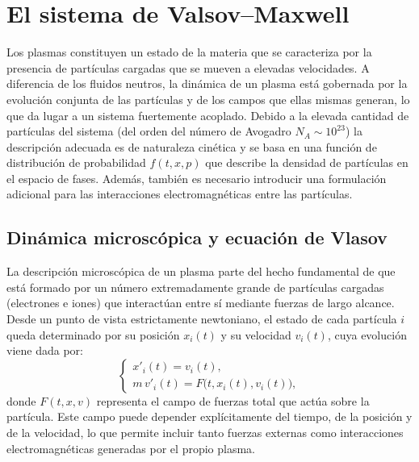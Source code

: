 \documentclass[11pt,a4paper,twoside,pdf]{article}
\numberwithin{equation}{section}
\begin{document}
\newpage

\section{El sistema de Valsov--Maxwell}

Los plasmas constituyen un estado de la materia que se caracteriza por la
presencia de partículas cargadas que se mueven a elevadas velocidades.
A diferencia de los fluidos neutros, la dinámica de un plasma está gobernada por la
evolución conjunta de las partículas y de los campos que ellas mismas generan, lo que
da lugar a un sistema fuertemente acoplado. Debido a la elevada cantidad de partículas del sistema (del orden del número de Avogadro $N_A \sim 10^{23}$) la descripción adecuada es de naturaleza cinética y se basa en una
función de distribución de probabilidad $f(t,x,p)$ que describe la densidad de partículas en el espacio
de fases. Además, también es necesario introducir una formulación adicional para las interacciones electromagnéticas entre las partículas.










\subsection{Dinámica microscópica y ecuación de Vlasov}

La descripción microscópica de un plasma parte del hecho fundamental de que está
formado por un número extremadamente grande de partículas cargadas (electrones e
iones) que interactúan entre sí mediante fuerzas de largo alcance. Desde un punto
de vista estrictamente newtoniano, el estado de cada partícula $i$ queda determinado
por su posición $x_i(t)$ y su velocidad $v_i(t)$, cuya evolución viene dada por:
\begin{equation}
\begin{cases}
x'_i(t) = v_i(t), \\[0.3em]
m\, v'_i(t) = F\big(t,x_i(t),v_i(t)\big),
\end{cases}
\label{eq:newton_micro}
\end{equation}
donde $F(t,x,v)$ representa el campo de fuerzas total que actúa sobre la partícula.
Este campo puede depender explícitamente del tiempo, de la posición y de la
velocidad, lo que permite incluir tanto fuerzas externas como interacciones
electromagnéticas generadas por el propio plasma.
\end{document}
